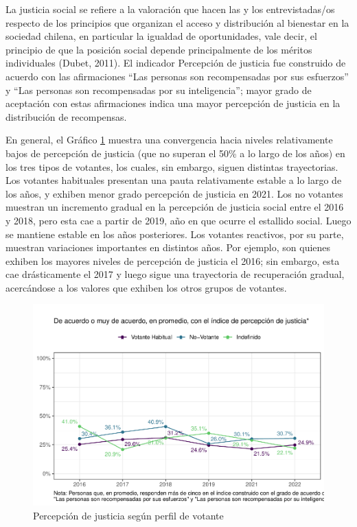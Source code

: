 \documentclass[
  12pt,
]{book}
\begin{document}
La justicia social se refiere a la valoración que hacen las y los entrevistadas/os respecto de los principios que organizan el acceso y distribución al bienestar en la sociedad chilena, en particular la igualdad de oportunidades, vale decir, el principio de que la posición social depende principalmente de los méritos individuales (Dubet, 2011). El indicador Percepción de justicia fue construido de acuerdo con las afirmaciones ``Las personas son recompensadas por sus esfuerzos'' y ``Las personas son recompensadas por su inteligencia''; mayor grado de aceptación con estas afirmaciones indica una mayor percepción de justicia en la distribución de recompensas.

En general, el Gráfico \ref{fig:indice-percjusticia-part} muestra una convergencia hacia niveles relativamente bajos de percepción de justicia (que no superan el 50\% a lo largo de los años) en los tres tipos de votantes, los cuales, sin embargo, siguen distintas trayectorias. Los votantes habituales presentan una pauta relativamente estable a lo largo de los años, y exhiben menor grado percepción de justicia en 2021. Los no votantes muestran un incremento gradual en la percepción de justicia social entre el 2016 y 2018, pero esta cae a partir de 2019, año en que ocurre el estallido social. Luego se mantiene estable en los años posteriores. Los votantes reactivos, por su parte, muestran variaciones importantes en distintos años. Por ejemplo, son quienes exhiben los mayores niveles de percepción de justicia el 2016; sin embargo, esta cae drásticamente el 2017 y luego sigue una trayectoria de recuperación gradual, acercándose a los valores que exhiben los otros grupos de votantes.

\begin{figure}

{\centering \includegraphics{reporte-elsoc_files/figure-latex/indice-percjusticia-part-1} 

}

\caption{Percepción de justicia según perfil de votante}\label{fig:indice-percjusticia-part}
\end{figure}
\end{document}
